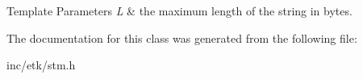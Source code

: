 \begin{DoxyTemplParams}{Template Parameters}
{\em L} & the maximum length of the string in bytes. \\
\hline
\end{DoxyTemplParams}


The documentation for this class was generated from the following file\-:\begin{DoxyCompactItemize}
\item 
inc/etk/stm.\-h\end{DoxyCompactItemize}
